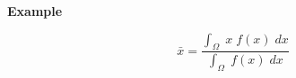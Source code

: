 
\renewcommand{\DocTitle}{Example}
\noprintanswers


\begin{center}
\textbf{\DocTitle}
\end{center}

$$
\bar{x}=\frac{\int_{\Omega}\;x\;f(x)\;dx}{\int_{\Omega}\;f(x)\;dx}
$$


